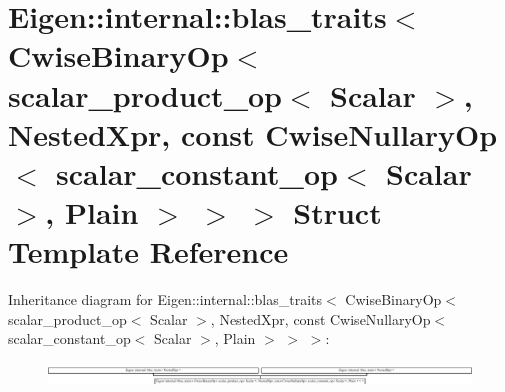\hypertarget{struct_eigen_1_1internal_1_1blas__traits_3_01_cwise_binary_op_3_01scalar__product__op_3_01_scala947462575c60123595df86e5556ae031}{}\section{Eigen\+:\+:internal\+:\+:blas\+\_\+traits$<$ Cwise\+Binary\+Op$<$ scalar\+\_\+product\+\_\+op$<$ Scalar $>$, Nested\+Xpr, const Cwise\+Nullary\+Op$<$ scalar\+\_\+constant\+\_\+op$<$ Scalar $>$, Plain $>$ $>$ $>$ Struct Template Reference}
\label{struct_eigen_1_1internal_1_1blas__traits_3_01_cwise_binary_op_3_01scalar__product__op_3_01_scala947462575c60123595df86e5556ae031}
Inheritance diagram for Eigen\+:\+:internal\+:\+:blas\+\_\+traits$<$ Cwise\+Binary\+Op$<$ scalar\+\_\+product\+\_\+op$<$ Scalar $>$, Nested\+Xpr, const Cwise\+Nullary\+Op$<$ scalar\+\_\+constant\+\_\+op$<$ Scalar $>$, Plain $>$ $>$ $>$\+:\begin{figure}[H]
\begin{center}
\leavevmode
\includegraphics[height=0.620155cm]{struct_eigen_1_1internal_1_1blas__traits_3_01_cwise_binary_op_3_01scalar__product__op_3_01_scala947462575c60123595df86e5556ae031}
\end{center}
\end{figure}
